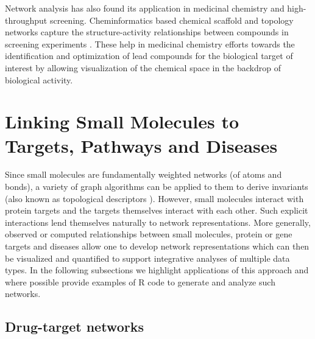 \documentclass[]{book}
\begin{document}
Network analysis has also found its application in medicinal chemistry
and high-throughput screening. Cheminformatics based chemical scaffold
and topology networks capture the structure-activity relationships
between compounds in screening experiments \cite{Varin:2011ve}. These
help in medicinal chemistry efforts towards the identification and
optimization of lead compounds for the biological target of interest
by allowing visualization of the chemical space in the backdrop of
biological activity.
  

\section{Linking Small Molecules to Targets, Pathways and Diseases}
\label{sec:link-small-molec}

Since small molecules are fundamentally weighted networks (of atoms
and bonds), a variety of graph algorithms can be applied to them to
derive invariants (also known as topological descriptors
\cite{Guha:2012vn}). However, small molecules interact with protein
targets and the targets themselves interact with each other. Such
explicit interactions lend themselves naturally to network
representations. More generally, observed or computed relationships
between small molecules, protein or gene targets and diseases allow
one to develop network representations which can then be visualized
and quantified to support integrative analyses of multiple data
types. In the following subsections we highlight applications of this
approach and where possible provide examples of R code to generate and
analyze such networks.

\subsection{Drug-target networks}
\label{sec:drug-target-networks}
\end{document}
